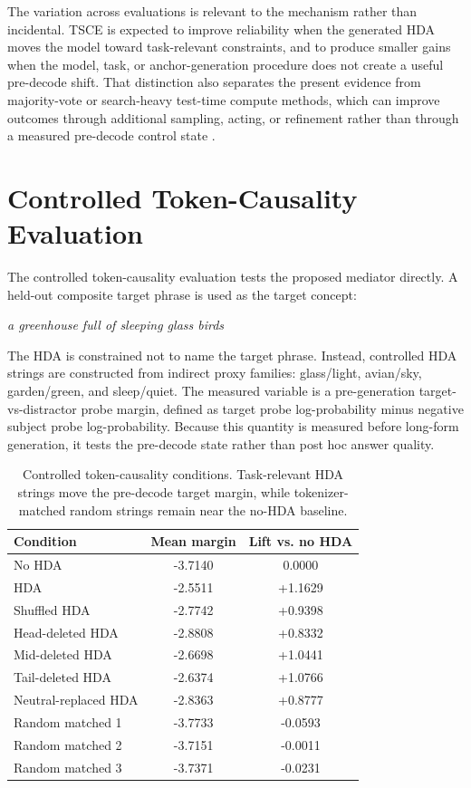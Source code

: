 \documentclass[11pt]{article}
\newcommand{\tsce}{\textsc{TSCE}}
\newcommand{\hda}{\textsc{HDA}}
\begin{document}
The variation across evaluations is relevant to the mechanism rather than incidental. \tsce{} is expected to improve reliability when the generated \hda{} moves the model toward task-relevant constraints, and to produce smaller gains when the model, task, or anchor-generation procedure does not create a useful pre-decode shift. That distinction also separates the present evidence from majority-vote or search-heavy test-time compute methods, which can improve outcomes through additional sampling, acting, or refinement rather than through a measured pre-decode control state \cite{self-consistency,self-refine,react}.

\section{Controlled Token-Causality Evaluation}

The controlled token-causality evaluation tests the proposed mediator directly. A held-out composite target phrase is used as the target concept:
\begin{center}
\emph{a greenhouse full of sleeping glass birds}
\end{center}

The \hda{} is constrained not to name the target phrase. Instead, controlled \hda{} strings are constructed from indirect proxy families: glass/light, avian/sky, garden/green, and sleep/quiet. The measured variable is a pre-generation target-vs-distractor probe margin, defined as target probe log-probability minus negative subject probe log-probability. Because this quantity is measured before long-form generation, it tests the pre-decode state rather than post hoc answer quality.

\begin{table}[H]
\centering
\begin{tabular}{lcc}
\toprule
Condition & Mean margin & Lift vs. no \hda{} \\
\midrule
No \hda{} & -3.7140 & 0.0000 \\
\hda{} & -2.5511 & +1.1629 \\
Shuffled \hda{} & -2.7742 & +0.9398 \\
Head-deleted \hda{} & -2.8808 & +0.8332 \\
Mid-deleted \hda{} & -2.6698 & +1.0441 \\
Tail-deleted \hda{} & -2.6374 & +1.0766 \\
Neutral-replaced \hda{} & -2.8363 & +0.8777 \\
Random matched 1 & -3.7733 & -0.0593 \\
Random matched 2 & -3.7151 & -0.0011 \\
Random matched 3 & -3.7371 & -0.0231 \\
\bottomrule
\end{tabular}
\caption{Controlled token-causality conditions. Task-relevant \hda{} strings move the pre-decode target margin, while tokenizer-matched random strings remain near the no-\hda{} baseline.}
\label{tab:token-causality}
\end{table}
\end{document}
